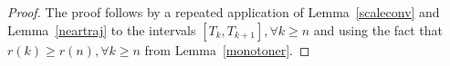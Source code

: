 \begin{proof}
The proof follows by a repeated application of Lemma~\ref{scaleconv} and Lemma~\ref{neartraj} to the
intervals $[T_k,T_{k+1}], \forall k\geq n$ and using the fact that $r(k)\geq r(n), \forall k\geq n$ 
from Lemma~\ref{monotoner}.
\end{proof}
\begin{comment}
\begin{proof}
Let $(x_n(t),y_n(t))$ denote the solution of the ODEs in \eqref{xyodes} as in Lemma~\ref{scaleconv} with initial conditions $x_n(T_n)=\hat{x}_n$ and $y_n(T_n)=\hat{y}_n$. Now, since $x_n \in B(0,1)$ and $y_n\in B(0,1)$, then from Lemma~\ref{neartraj} if follows that there exists $T_\epsilon$ and $c_\epsilon$ such that $x_n(t)\in A^{\epsilon/2}(\lambda_\infty(y_n(t)),y_n(t)), \forall t\geq T_n+T_\epsilon$. Choose $T$ in Definition~\ref{deft} to be $T\stackrel{def}{=}T_\epsilon$. Now, from Lemma~\ref{scaleconv} it follows that for $n$ large $||x_n(t)-\hat{x}(t)||\leq \epsilon/2, \forall t \in [T_n,T_n+T]$. Thus $(\hat{x}_{m(n+1)},\hat{y}_{m(n+1)}) \in (A^\epsilon(\hat{y}_{m(n+1)}),\hat{y}_{m(n+1)})$. Now if rescaling again happens at iteration $m(n+1)$, i.e., if $r(n+1)>r(n)$ then if follows from Lemma~\ref{neartraj} that $x_{n+1} (t)\in A^{\epsilon/2}(\lambda_\infty(y_n(t)),y_n(t)), \forall t\in[T_{n+1},T_{n+2}]$\footnote{ Note that the results of Lemma~\ref{neartraj} holds for all scaling factors $c>c_\epsilon$ all times $t>T_n+T$}. Again, by appealing to Lemma~\ref{scaleconv} if follows that $(\hat{x}_{k},\hat{y}_{k}) \in (A^\epsilon(\hat{y}_{k}),\hat{y}_{k}), m(n+1)\leq k\leq m(n+2)$. The same argument can be repeated for further rescaling instants and the proof follows.
\end{proof}\qed
\end{comment}


